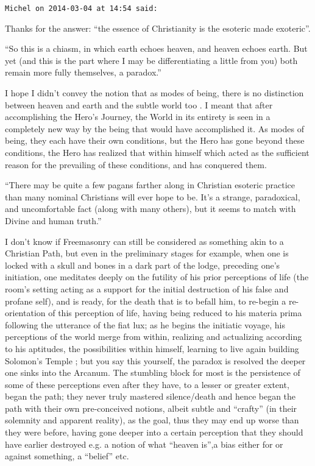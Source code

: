 \begin{footnotesize}
\begin{sffamily}
\hfill

\texttt{Michel on 2014-03-04 at 14:54 said:}

Thanks for the answer: ``the essence of Christianity is the esoteric made exoteric''.

``So this is a chiasm, in which earth echoes heaven, and heaven echoes earth. But yet (and this is the part where I may be differentiating a little from you) both remain more fully themselves, a paradox.''

I hope I didn't convey the notion that as modes of being, there is no distinction between heaven and earth and the subtle world too . I meant that after accomplishing the Hero's Journey, the World in its entirety is seen in a completely new way by the being that would have accomplished it. As modes of being, they each have their own conditions, but the Hero has gone beyond these conditions, the Hero has realized that within himself which acted as the sufficient reason for the prevailing of these conditions, and has conquered them.

``There may be quite a few pagans farther along in Christian esoteric practice than many nominal Christians will ever hope to be. It's a strange, paradoxical, and uncomfortable fact (along with many others), but it seems to match with Divine and human truth.''

I don't know if Freemasonry can still be considered as something akin to a Christian Path, but even in the preliminary stages for example, when one is locked with a skull and bones in a dark part of the lodge, preceding one's initiation, one meditates deeply on the futility of his prior perceptions of life (the room's setting acting as a support for the initial destruction of his false and profane self), and is ready, for the death that is to befall him, to re-begin a re-orientation of this perception of life, having being reduced to his materia prima following the utterance of the fiat lux; as he begins the initiatic voyage, his perceptions of the world merge from within, realizing and actualizing according to his aptitudes, the possibilities within himself, learning to live again building Solomon's Temple ; but you say this yourself, the paradox is resolved the deeper one sinks into the Arcanum. The stumbling block for most is the persistence of some of these perceptions even after they have, to a lesser or greater extent, began the path; they never truly mastered silence/death and hence began the path with their own pre-conceived notions, albeit subtle and ``crafty'' (in their solemnity and apparent reality), as the goal, thus they may end up worse than they were before, having gone deeper into a certain perception that they should have earlier destroyed e.g. a notion of what ``heaven is'',a bias either for or against something, a ``belief'' etc.


\end{sffamily}
\end{footnotesize}
